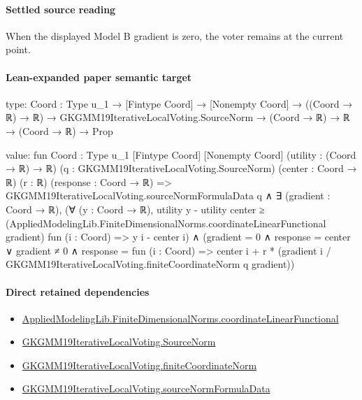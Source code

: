 \documentclass[10pt]{article}
\begin{document}
\paragraph{Settled source reading}
\begin{sloppypar}
When the displayed Model B gradient is zero, the voter remains at the current point.\allowbreak{}
\end{sloppypar}

\paragraph{Lean-expanded paper semantic target}
\begin{ReviewVerbatim}
type:
{Coord : Type u_1} →
  [Fintype Coord] →
    [Nonempty Coord] → ((Coord → ℝ) → ℝ) → GKGMM19IterativeLocalVoting.SourceNorm → (Coord → ℝ) → ℝ → (Coord → ℝ) → Prop

value:
fun {Coord : Type u_1} [Fintype Coord] [Nonempty Coord] (utility : (Coord → ℝ) → ℝ)
    (q : GKGMM19IterativeLocalVoting.SourceNorm) (center : Coord → ℝ) (r : ℝ) (response : Coord → ℝ) =>
  GKGMM19IterativeLocalVoting.sourceNormFormulaData q ∧
    ∃ (gradient : Coord → ℝ),
      (∀ (y : Coord → ℝ),
          utility y - utility center ≥
            (AppliedModelingLib.FiniteDimensionalNorms.coordinateLinearFunctional gradient) fun (i : Coord) =>
              y i - center i) ∧
        (gradient = 0 ∧ response = center ∨
          gradient ≠ 0 ∧
            response = fun (i : Coord) =>
              center i + r * (gradient i / GKGMM19IterativeLocalVoting.finiteCoordinateNorm q gradient))
\end{ReviewVerbatim}

\paragraph{Direct retained dependencies}
\begin{itemize}\raggedright
\item \hyperlink{governing-declaration-76e30f898cb62445}{Applied\allowbreak{}Modeling\allowbreak{}Lib.\allowbreak{}Finite\allowbreak{}Dimensional\allowbreak{}Norms.\allowbreak{}coordinate\allowbreak{}Linear\allowbreak{}Functional}
\item \hyperlink{governing-declaration-6fa4ab9852321b03}{GKGMM19\allowbreak{}Iterative\allowbreak{}Local\allowbreak{}Voting.\allowbreak{}Source\allowbreak{}Norm}
\item \hyperlink{governing-declaration-6b5981b41f6efa87}{GKGMM19\allowbreak{}Iterative\allowbreak{}Local\allowbreak{}Voting.\allowbreak{}finite\allowbreak{}Coordinate\allowbreak{}Norm}
\item \hyperlink{paper-prerequisite-d7774e2d1adfed0f}{GKGMM19\allowbreak{}Iterative\allowbreak{}Local\allowbreak{}Voting.\allowbreak{}source\allowbreak{}Norm\allowbreak{}Formula\allowbreak{}Data}
\end{itemize}
\end{document}
